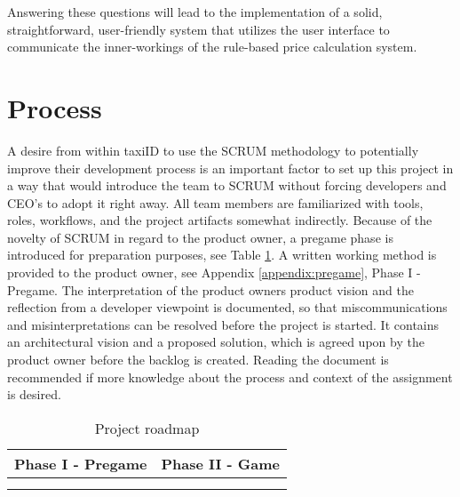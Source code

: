 Answering these questions will lead to the implementation of a solid, straightforward, user-friendly system that utilizes the user interface to communicate the inner-workings of the rule-based price calculation system.

%
\section{Process}
A desire from within taxiID to use the SCRUM methodology to potentially improve their development process is an important factor to set up this project in a way that would introduce the team to SCRUM without forcing developers and CEO's to adopt it right away. All team members are familiarized with tools, roles, workflows, and the project artifacts somewhat indirectly. Because of the novelty of SCRUM in regard to the product owner, a pregame phase is introduced for preparation purposes, see Table \ref{tab:planning}. A written working method is provided to the product owner, see Appendix \ref{appendix:pregame}, Phase I - Pregame. The interpretation of the product owners product vision and the reflection from a developer viewpoint is documented, so that miscommunications and misinterpretations can be resolved before the project is started. It contains an architectural vision and a proposed solution, which is agreed upon by the product owner before the backlog is created. Reading the document is recommended if more knowledge about the process and context of the assignment is desired.

\begin{table}[htbp!]
	\centering
	\begin{tabular}{ccc|c|c|c|c|c|c|c|c}
		\toprule
		\multicolumn{3}{c}{Phase I - Pregame}   &
		\multicolumn{8}{c}{Phase II - Game}  		\\
		\midrule
		\rotate{week 1}                         &
		\rotate{week 2}                         &
		\rotate{week 3}                         &
		\rotate{week 4}                         &
		\rotate{week 5}                         &
		\rotate{week 6}                         &
		\rotate{week 7}                         &
		\rotate{week 8}                         &
		\rotate{week 9}                         &
		\rotate{week 10}                        &
		\rotate{week 11}                        \\
		\midrule
		\rotate{product definition}     				&
		\rotate{architectural vision} 					&
		\rotate{proposed solution}							&
		\rotate{sprint 1}                       &
		\rotate{sprint 2}                       &
		\rotate{sprint 3}                       &
		\rotate{sprint 4}                       &
		\rotate{sprint 5}                       &
		\rotate{sprint 6}                       &
		\rotate{sprint 7}                       &
		\rotate{sprint 8}                       \\
		\bottomrule
	\end{tabular}
	\caption[Project Roadmap]{Project roadmap}
	\label{tab:planning}
\end{table}
